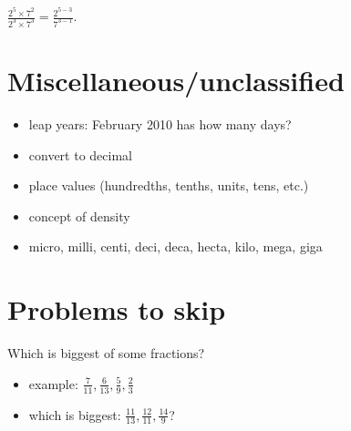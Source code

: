 \documentclass[fullpage,twocolumn]{article}
\begin{document}
$\frac{2^5 \times 7^2}{2^3 \times 7^3} = \frac{2^{5-3}}{7^{3-1}}$.

\section{Miscellaneous/unclassified}
\begin{itemize}
\item leap years: February  2010 has how many days?
\item convert to decimal
\item place values (hundredths, tenths, units, tens, etc.)
\item concept of density
\item micro, milli, centi, deci, deca, hecta, kilo, mega, giga
\end{itemize} 



\section{Problems to skip}
Which is biggest of some fractions? 
\begin{itemize}
\item example: $\frac{7}{11}, \frac{6}{13}, \frac{5}{9}, \frac{2}{3}$
\item which is biggest: $\frac{11}{13}, \frac{12}{11}, \frac{14}{9}$?
\end{itemize} 

\end{document}
